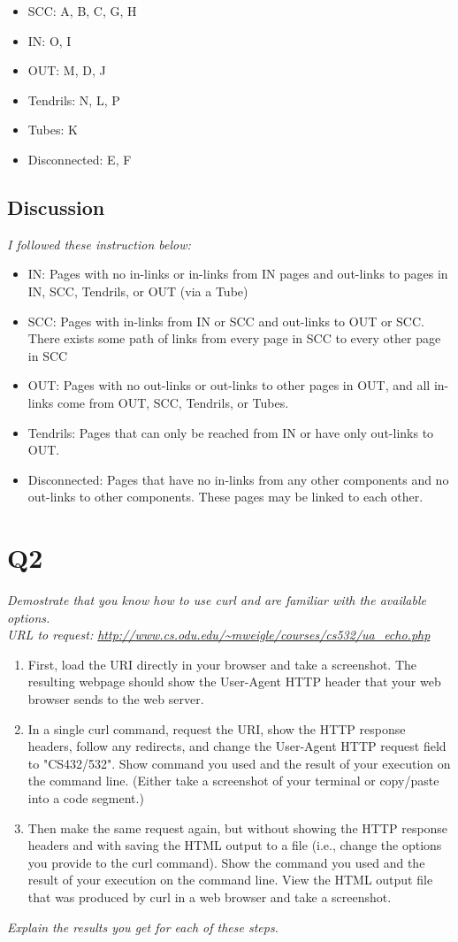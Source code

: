 \documentclass[12pt]{article}
\begin{document}
\begin{itemize}
    \item SCC: A, B, C, G, H
    \item IN: O, I
    \item OUT: M, D, J
    \item Tendrils: N, L, P
    \item Tubes: K
    \item Disconnected: E, F
\end{itemize}
\subsection*{Discussion}

\emph{I followed these instruction below:}
\begin{itemize}
    \item IN: Pages with no in-links or in-links from IN pages and out-links to pages in IN, SCC, Tendrils, or OUT (via a Tube)
    \item SCC: Pages with in-links from IN or SCC and out-links to OUT or SCC. There exists some path of links from every page in SCC to
every other page in SCC
    \item OUT: Pages with no out-links or out-links to other pages in OUT, and all in-links come from OUT, SCC, Tendrils, or Tubes.
    \item Tendrils: Pages that can only be reached from IN or have only out-links to OUT.
    \item Disconnected: Pages that have no in-links from any other components and no out-links to other components. These pages
may be linked to each other.
\end{itemize}

\section*{Q2}
\emph{Demostrate that you know how to use curl and are familiar with the available options. \\
URL to request: \url{http://www.cs.odu.edu/~mweigle/courses/cs532/ua_echo.php}
}
\begin{enumerate}[label=(\alph*)]
    \item First, load the URI directly in your browser and take a screenshot. The resulting webpage should show the User-Agent HTTP header that your web browser sends to the web server.
    \item In a single curl command, request the URI, show the HTTP response headers, follow any redirects, and change the User-Agent HTTP request field to "CS432/532". Show command you used and the result of your execution on the command line. (Either take a screenshot of your terminal or copy/paste into a code segment.)
    \item  Then make the same request again, but without showing the HTTP response headers and with saving the HTML output to a file (i.e., change the options you provide to the curl command). Show the command you used and the result of your execution on the command line. View the HTML output file that was produced by curl in a web browser and take a screenshot.
\end{enumerate}
\emph{Explain the results you get for each of these steps.}
\end{document}

